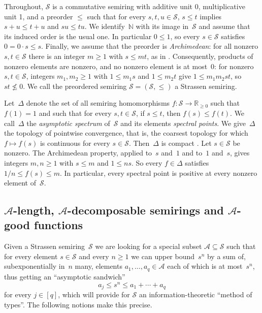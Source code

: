 \documentclass[11pt,letterpaper]{article}
\newcommand{\RR}{\mathbb{R}}
\newcommand{\NN}{\mathbb{N}}
\begin{document}
Throughout, $\mathcal{S}$ is a commutative semiring with additive unit 0, multiplicative unit 1, and a preorder $\leq$ such that for every $s,t,u \in \mathcal{S}$, $s\leq t$ implies $s + u \leq t + u$ and $su \leq tu$. We identify~$\NN$ with its image in~$\mathcal{S}$ and assume that its induced order is the usual one. In particular $0 \leq 1$, so every $s \in \mathcal{S}$ satisfies $0 = 0 \cdot s \leq s$. Finally, we assume that the preorder is \emph{Archimedean}: for all nonzero $s, t \in \mathcal{S}$ there is an integer $m \geq 1$ with $s \leq mt$, as in \cite[(2.5)]{strassen1988asymptotic}. Consequently, products of nonzero elements are nonzero, and no nonzero element is at most~$0$: for nonzero $s, t \in \mathcal{S}$, integers $m_1, m_2 \geq 1$ with $1 \leq m_1 s$ and $1 \leq m_2 t$ give $1 \leq m_1 m_2 st$, so $st \not\leq 0$. We call the preordered semiring $\mathcal{S} = (\mathcal{S}, \leq)$ a Strassen semiring.

Let~$\Delta$ denote the set of all semiring homomorphisms $f : \mathcal{S} \to \RR_{\geq0}$ such that $f(1) = 1$ and such that for every $s,t \in \mathcal{S}$, if $s \leq t$, then $f(s) \leq f(t)$. We call~$\Delta$ the \emph{asymptotic spectrum} of~$\mathcal{S}$ and its elements \emph{spectral points}. We give~$\Delta$ the topology of pointwise convergence, that is, the coarsest topology for which $f \mapsto f(s)$ is continuous for every $s \in \mathcal{S}$. Then~$\Delta$ is compact \cite[Corollary~2.6]{strassen1988asymptotic}. Let $s \in \mathcal{S}$ be nonzero. The Archimedean property, applied to~$s$ and~$1$ and to~$1$ and~$s$, gives integers $m, n \geq 1$ with $s \leq m$ and $1 \leq ns$. So every $f \in \Delta$ satisfies $1/n \leq f(s) \leq m$. In particular, every spectral point is positive at every nonzero element of~$\mathcal{S}$.

\subsection{\texorpdfstring{$\mathcal{A}$-length,}{A-length,} \texorpdfstring{$\mathcal{A}$}{A}-decomposable semirings and \texorpdfstring{$\mathcal{A}$}{A}-good functions}

Given a Strassen semiring~$\mathcal{S}$ we are looking for a special subset $\mathcal{A}\subseteq \mathcal{S}$ such that for every element $s \in \mathcal{S}$ and every $n\geq1$ we can upper bound~$s^n$ by a sum of, subexponentially in~$n$ many, elements $a_1, \ldots, a_q \in \mathcal{A}$ each of which is at most~$s^n$, thus getting an ``asymptotic sandwich''
\begin{equation}\label{eq:sand}
a_j \leq s^n \leq a_1 + \cdots + a_q
\end{equation}
for every $j \in [q]$, which will provide for  $\mathcal{S}$ an information-theoretic ``method of types''. The following notions make this precise.
\end{document}
